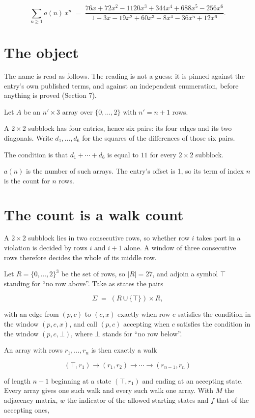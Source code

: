 \documentclass[11pt]{article}
\theoremstyle{definition}
\begin{document}
\[\sum_{n \ge 1} a(n)\,x^n \;=\; \frac{76x + 72x^{2} - 1120x^{3} + 344x^{4} + 688x^{5} - 256x^{6}}{1 - 3x - 19x^{2} + 60x^{3} - 8x^{4} - 36x^{5} + 12x^{6}}.\]

\section{The object}

The name is read as follows. The reading is not a guess: it is pinned against the entry's own published terms, and against an independent enumeration, before anything is proved (Section 7).

Let $A$ be an $n' \times 3$ array over $\{0,\dots,2\}$ with $n' = n + 1$ rows.

A $2\times2$ subblock has four entries, hence six pairs: its four edges and its two diagonals. Write $d_1,\dots,d_6$ for the squares of the differences of those six pairs.

The condition is that $d_1+\cdots+d_6$ is equal to $11$ for every $2\times2$ subblock.

$a(n)$ is the number of such arrays. The entry's offset is 1, so its term of index $n$ is the count for $n$ rows.

\section{The count is a walk count}

A $2\times2$ subblock lies in two consecutive rows, so whether row $i$ takes part in a violation is decided by rows $i$ and $i+1$ alone. A window of three consecutive rows therefore decides the whole of its middle row.

Let $R = \{0,\dots,2\}^{3}$ be the set of rows, so $|R| = 27$, and adjoin a symbol $\top$ standing for ``no row above''. Take as states the pairs

\[\Sigma \;=\; (R \cup \{\top\}) \times R,\]

with an edge from $(p,c)$ to $(c,x)$ exactly when row $c$ satisfies the condition in the window $(p,c,x)$, and call $(p,c)$ accepting when $c$ satisfies the condition in the window $(p,c,\bot)$, where $\bot$ stands for ``no row below''.

An array with rows $r_1,\dots,r_n$ is then exactly a walk

\[(\top,r_1) \to (r_1,r_2) \to \cdots \to (r_{n-1},r_n)\]

of length $n-1$ beginning at a state $(\top,r_1)$ and ending at an accepting state. Every array gives one such walk and every such walk one array. With $M$ the adjacency matrix, $w$ the indicator of the allowed starting states and $f$ that of the accepting ones,
\end{document}
